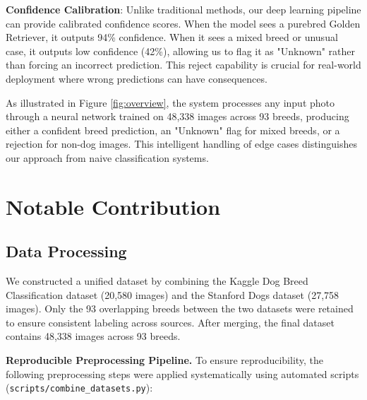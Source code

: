 \documentclass[final]{article}
\begin{document}
\textbf{Confidence Calibration}: Unlike traditional methods, our deep learning pipeline can provide calibrated confidence scores. When the model sees a purebred Golden Retriever, it outputs 94\% confidence. When it sees a mixed breed or unusual case, it outputs low confidence (42\%), allowing us to flag it as "Unknown" rather than forcing an incorrect prediction. This reject capability is crucial for real-world deployment where wrong predictions can have consequences.

As illustrated in Figure \ref{fig:overview}, the system processes any input photo through a neural network trained on 48,338 images across 93 breeds, producing either a confident breed prediction, an "Unknown" flag for mixed breeds, or a rejection for non-dog images. This intelligent handling of edge cases distinguishes our approach from naive classification systems.

\section*{Notable Contribution}

\subsection*{Data Processing}

We constructed a unified dataset by combining the Kaggle Dog Breed Classification dataset (20,580 images) and the Stanford Dogs dataset (27,758 images). Only the 93 overlapping breeds between the two datasets were retained to ensure consistent labeling across sources. After merging, the final dataset contains 48,338 images across 93 breeds.

\textbf{Reproducible Preprocessing Pipeline.} To ensure reproducibility, the following preprocessing steps were applied systematically using automated scripts (\texttt{scripts/combine\_datasets.py}):
\end{document}
